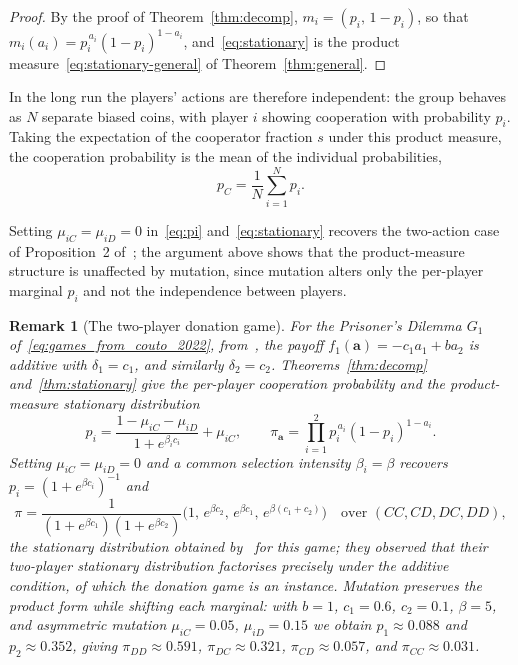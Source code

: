\documentclass[11pt]{article}
\newtheorem{remark}{Remark}
\newcommand{\bfa}{\mathbf{a}}
\newcommand{\bfm}{\mathbf{m}} %
\newcommand{\pC}{p_C}
\providecommand{\DIFaddtex}[1]{{\protect\color{blue}\uwave{#1}}} %
\providecommand{\DIFdeltex}[1]{{\protect\color{red}\sout{#1}}}                      %
\providecommand{\DIFaddbegin}{} %
\providecommand{\DIFaddend}{} %
\providecommand{\DIFdelbegin}{} %
\providecommand{\DIFdelend}{} %
\providecommand{\DIFadd}[1]{\texorpdfstring{\DIFaddtex{#1}}{#1}} %
\providecommand{\DIFdel}[1]{\texorpdfstring{\DIFdeltex{#1}}{}} %
\newcommand{\DIFscaledelfig}{0.5}
\newlength{\DIFdelgraphicswidth} %
\newlength{\DIFdelgraphicsheight} %
\newcommand{\DIFaddincludegraphics}[2][]{{\color{blue}\fbox{\DIFOincludegraphics[#1]{#2}}}} %
\newcommand{\DIFdelincludegraphics}[2][]{%
\sbox{\DIFdelgraphicsbox}{\DIFOincludegraphics[#1]{#2}}%
\settoboxwidth{\DIFdelgraphicswidth}{\DIFdelgraphicsbox} %
\settoboxtotalheight{\DIFdelgraphicsheight}{\DIFdelgraphicsbox} %
\scalebox{\DIFscaledelfig}{%
\parbox[b]{\DIFdelgraphicswidth}{\usebox{\DIFdelgraphicsbox}\\[-\baselineskip] \rule{\DIFdelgraphicswidth}{0em}}\llap{\resizebox{\DIFdelgraphicswidth}{\DIFdelgraphicsheight}{%
\setlength{\unitlength}{\DIFdelgraphicswidth}%
\begin{picture}(1,1)%
\thicklines\linethickness{2pt} %
{\color[rgb]{1,0,0}\put(0,0){\framebox(1,1){}}}%
{\color[rgb]{1,0,0}\put(0,0){\line( 1,1){1}}}%
{\color[rgb]{1,0,0}\put(0,1){\line(1,-1){1}}}%
\end{picture}%
}\hspace*{3pt}}} %
} %
\DeclareRobustCommand{\DIFaddbegin}{\DIFOaddbegin \let\includegraphics\DIFaddincludegraphics} %
\DeclareRobustCommand{\DIFaddend}{\DIFOaddend \let\includegraphics\DIFOincludegraphics} %
\DeclareRobustCommand{\DIFdelbegin}{\DIFOdelbegin \let\includegraphics\DIFdelincludegraphics} %
\DeclareRobustCommand{\DIFdelend}{\DIFOaddend \let\includegraphics\DIFOincludegraphics} %
\begin{document}
\begin{proof}

By the proof of Theorem~\ref{thm:decomp}, \DIFdelbegin \DIFdel{\(m_i=(p_i,\,1-p_i)\)}\DIFdelend \DIFaddbegin \DIFadd{\(\bfm_i=(p_i,\,1-p_i)\)}\DIFaddend , so that
\DIFdelbegin \DIFdel{\(m_i(a_i)=p_i^{\,a_i}(1-p_i)^{1-a_i}\)}\DIFdelend \DIFaddbegin \DIFadd{\(\bfm_i(a_i)=p_i^{\,a_i}(1-p_i)^{1-a_i}\)}\DIFaddend , and~\eqref{eq:stationary} is the
product measure~\eqref{eq:stationary-general} of Theorem~\ref{thm:general}.

\end{proof}

In the long run the players' actions are therefore independent: the group behaves as
\(N\) separate biased coins, with player \(i\) showing cooperation with probability
\(p_i\). Taking the expectation of the cooperator fraction \(s\) under this product
measure, the cooperation probability is the mean of the individual probabilities,
\begin{equation}\label{eq:pC-mean}
  \pC = \frac{1}{N}\sum_{i=1}^{N} p_i.
\end{equation}

Setting \(\mu_{iC}=\mu_{iD}=0\) in~\eqref{eq:pi} and~\eqref{eq:stationary}
recovers the two-action
case of Proposition~2 of~\cite{couto2023multiplayer}; the argument above shows
that the product-measure structure is unaffected by mutation, since mutation
alters only the per-player marginal \(p_i\) and not the independence between
players.

\begin{remark}[The two-player donation game]
For the Prisoner's Dilemma \(G_1\) of~\eqref{eq:games_from_couto_2022},
from~\cite{couto2022introspection}, the payoff \(f_1(\bfa)=-c_1 a_1+b a_2\) is additive
with \(\delta_1=c_1\), and similarly \(\delta_2=c_2\). Theorems~\ref{thm:decomp}
and~\ref{thm:stationary} give the per-player cooperation probability and the
product-measure stationary distribution
\[
  p_i = \frac{1-\mu_{iC}-\mu_{iD}}{1+e^{\beta_i c_i}}+\mu_{iC}, \qquad
  \pi_{\bfa} = \prod_{i=1}^{2} p_i^{\,a_i}(1-p_i)^{1-a_i}.
\]
Setting \(\mu_{iC}=\mu_{iD}=0\) and a common selection intensity \(\beta_i=\beta\)
recovers \(p_i=(1+e^{\beta c_i})^{-1}\) and
\[
  \pi = \frac{1}{(1+e^{\beta c_1})(1+e^{\beta c_2})}
        \bigl(1,\,e^{\beta c_2},\,e^{\beta c_1},\,e^{\beta(c_1+c_2)}\bigr)
  \quad\text{over } (CC,CD,DC,DD),
\]
the stationary distribution obtained by~\cite{couto2022introspection} for this game;
they
observed that their two-player stationary distribution factorises precisely under the
additive condition, of which the donation game is an instance. Mutation preserves the
product form while shifting each marginal: with \(b=1\), \(c_1=0.6\), \(c_2=0.1\),
\(\beta=5\), and asymmetric mutation \(\mu_{iC}=0.05\), \(\mu_{iD}=0.15\) we obtain
\(p_1\approx0.088\) and \(p_2\approx0.352\), giving \(\pi_{DD}\approx0.591\),
\(\pi_{DC}\approx0.321\), \(\pi_{CD}\approx0.057\), and \(\pi_{CC}\approx0.031\).
\end{remark}
\end{document}

